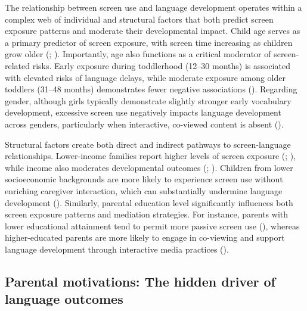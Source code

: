 \documentclass[
  man,
  floatsintext,
  longtable,
  nolmodern,
  notxfonts,
  notimes,
  colorlinks=true,linkcolor=blue,citecolor=blue,urlcolor=blue]{apa7}
\begin{document}
The relationship between screen use and language development operates
within a complex web of individual and structural factors that both
predict screen exposure patterns and moderate their developmental
impact. Child age serves as a primary predictor of screen exposure, with
screen time increasing as children grow older
(;
).
Importantly, age also functions as a critical moderator of
screen-related risks. Early exposure during toddlerhood (12--30 months)
is associated with elevated risks of language delays, while moderate
exposure among older toddlers (31--48 months) demonstrates fewer
negative associations
(). Regarding gender, although girls typically demonstrate slightly
stronger early vocabulary development, excessive screen use negatively
impacts language development across genders, particularly when
interactive, co-viewed content is absent
().

Structural factors create both direct and indirect pathways to
screen-language relationships. Lower-income families report higher
levels of screen exposure
(; ), while income also moderates developmental outcomes
(;
). Children from lower socioeconomic backgrounds are
more likely to experience screen use without enriching caregiver
interaction, which can substantially undermine language development
().
Similarly, parental education level significantly influences both screen
exposure patterns and mediation strategies. For instance, parents with
lower educational attainment tend to permit more passive screen use
(), 
whereas higher-educated parents are more likely to engage in
co-viewing and support language development through interactive media
practices ().

\subsection{Parental motivations: The hidden driver of language
outcomes}\label{parental-motivations-the-hidden-driver-of-language-outcomes}
\end{document}
